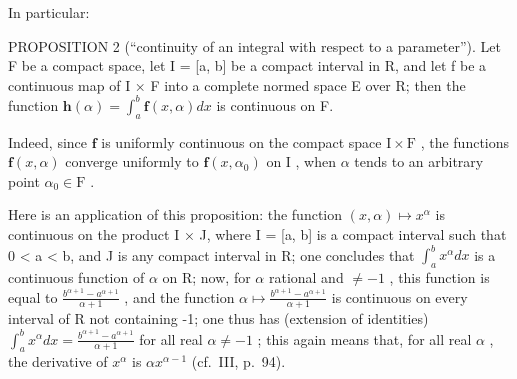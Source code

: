In particular:

PROPOSITION 2 (``continuity of an integral with respect to a parameter''). Let F be a compact space, let I = {[}a, b{]} be a compact interval in R, and let f be a continuous map of I × F into a complete normed space E over R; then the function \(\mathbf{h}(\alpha) = \int_{a}^{b} \mathbf{f}(x, \alpha) dx\) is continuous on F.

Indeed, since \(\mathbf{f}\) is uniformly continuous on the compact space \(\mathrm{I} \times \mathrm{F}\) , the functions \(\mathbf{f}(x, \alpha)\) converge uniformly to \(\mathbf{f}(x, \alpha_0)\) on \(\mathrm{I}\) , when \(\alpha\) tends to an arbitrary point \(\alpha_0 \in \mathrm{F}\) .

Here is an application of this proposition: the function \((x, \alpha) \mapsto x^{\alpha}\) is continuous on the product I × J, where I = {[}a, b{]} is a compact interval such that 0 \textless{} a \textless{} b, and J is any compact interval in R; one concludes that \(\int_{a}^{b} x^{\alpha} dx\) is a continuous function of \(\alpha\) on R; now, for \(\alpha\) rational and \(\neq -1\) , this function is equal to \(\frac{b^{\alpha+1} - a^{\alpha+1}}{\alpha + 1}\) , and the function \(\alpha \mapsto \frac{b^{\alpha+1} - a^{\alpha+1}}{\alpha + 1}\) is continuous on every interval of R not containing -1; one thus has (extension of identities) \(\int_{a}^{b} x^{\alpha} dx = \frac{b^{\alpha+1} - a^{\alpha+1}}{\alpha + 1}\) for all real \(\alpha \neq -1\) ; this again means that, for all real \(\alpha\) , the derivative of \(x^{\alpha}\) is \(\alpha x^{\alpha-1}\) (cf.~III, p.~94).

